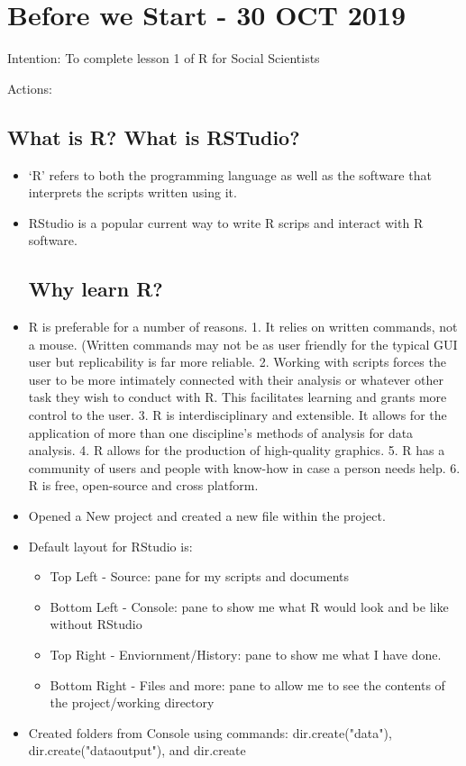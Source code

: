 \documentclass{article}
\begin{document}
\section{Before we Start - 30 OCT 2019}

Intention: To complete lesson 1 of R for Social Scientists

Actions:

\subsection{What is R? What is RSTudio?}
\begin{itemize}
    \item `R' refers to both the programming language as well as the software that interprets the scripts written using it.
    \item RStudio is a popular current way to write R scrips and interact with R software.
    
\subsection{Why learn R?}

    \item R is preferable for a number of reasons. 1. It relies on written commands, not a mouse. (Written commands may not be as user friendly for the typical GUI user but replicability is far more reliable. 2. Working with scripts forces the user to be more intimately connected with their analysis or whatever other task they wish to conduct with R. This facilitates learning and grants more control to the user. 3. R is interdisciplinary and extensible. It allows for the application of more than one discipline's methods of analysis for data analysis. 4. R allows for the production of high-quality graphics. 5. R has a community of users and people with know-how in case a person needs help. 6. R is free, open-source and cross platform.
    \item Opened a New project and created a new file within the project.
    \item Default layout for RStudio is: 
    \begin{itemize}
        \item Top Left - Source: pane for my scripts and documents
        \item Bottom Left - Console: pane to show me what R would look and be like without RStudio
        \item Top Right - Enviornment/History: pane to show me what I have done.
        \item Bottom Right - Files and more: pane to allow me to see the contents of the project/working directory
    \end{itemize}
\item Created folders from Console using commands: dir.create("data"), dir.create("data\textunderscore output"), and dir.create


\end{itemize}
\end{document}
